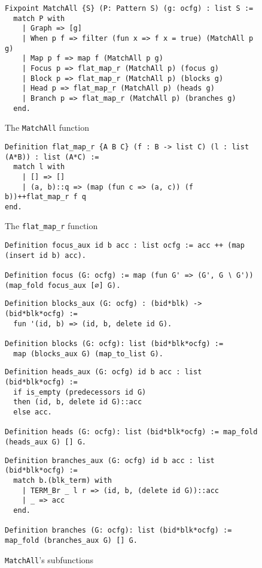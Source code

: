 \documentclass[11pt]{article}
\newcommand{\inlinecoq}[1]{\mbox{\lstinline[style=customcoq,columns=fixed,basewidth=.48em]{#1}}}
\newcommand{\ilc}[1]{\inlinecoq{#1}}
\begin{document}
\begin{figure}
  \label{fig:match}
  \begin{lstlisting}[style=customcoq,basicstyle=\small\ttfamily]
Fixpoint MatchAll {S} (P: Pattern S) (g: ocfg) : list S :=
  match P with
    | Graph => [g]
    | When p f => filter (fun x => f x = true) (MatchAll p g) 
    | Map p f => map f (MatchAll p g)
    | Focus p => flat_map_r (MatchAll p) (focus g)
    | Block p => flat_map_r (MatchAll p) (blocks g)
    | Head p => flat_map_r (MatchAll p) (heads g)
    | Branch p => flat_map_r (MatchAll p) (branches g)
  end.
  \end{lstlisting}
  \caption{The \ilc{MatchAll} function}
  \label{fig:matchall}
\end{figure}

\begin{figure}
  \begin{lstlisting}[style=customcoq,basicstyle=\small\ttfamily]
Definition flat_map_r {A B C} (f : B -> list C) (l : list (A*B)) : list (A*C) :=
  match l with
    | [] => []
    | (a, b)::q => (map (fun c => (a, c)) (f b))++flat_map_r f q
end.
  \end{lstlisting}
  \caption{The \ilc{flat_map_r} function}
  \label{fig:flatmap}
\end{figure}
\begin{figure}
  \begin{lstlisting}[style=customcoq,basicstyle=\small\ttfamily]
Definition focus_aux id b acc : list ocfg := acc ++ (map (insert id b) acc).

Definition focus (G: ocfg) := map (fun G' => (G', G ∖ G')) (map_fold focus_aux [∅] G).
  \end{lstlisting}
  
  \begin{lstlisting}[style=customcoq,basicstyle=\small\ttfamily]
Definition blocks_aux (G: ocfg) : (bid*blk) -> (bid*blk*ocfg) :=
  fun '(id, b) => (id, b, delete id G).

Definition blocks (G: ocfg): list (bid*blk*ocfg) :=
  map (blocks_aux G) (map_to_list G).
  \end{lstlisting}
  
  \begin{lstlisting}[style=customcoq,basicstyle=\small\ttfamily]
Definition heads_aux (G: ocfg) id b acc : list (bid*blk*ocfg) :=
  if is_empty (predecessors id G)
  then (id, b, delete id G)::acc
  else acc.

Definition heads (G: ocfg): list (bid*blk*ocfg) := map_fold (heads_aux G) [] G.
  \end{lstlisting}
  
  \begin{lstlisting}[style=customcoq,basicstyle=\small\ttfamily]
Definition branches_aux (G: ocfg) id b acc : list (bid*blk*ocfg) :=
  match b.(blk_term) with
    | TERM_Br _ l r => (id, b, (delete id G))::acc
    | _ => acc
  end.

Definition branches (G: ocfg): list (bid*blk*ocfg) := map_fold (branches_aux G) [] G.
  \end{lstlisting}
  \caption{\ilc{MatchAll}'s subfunctions}
  \label{fig:match_sub_funs}
\end{figure}
\end{document}
